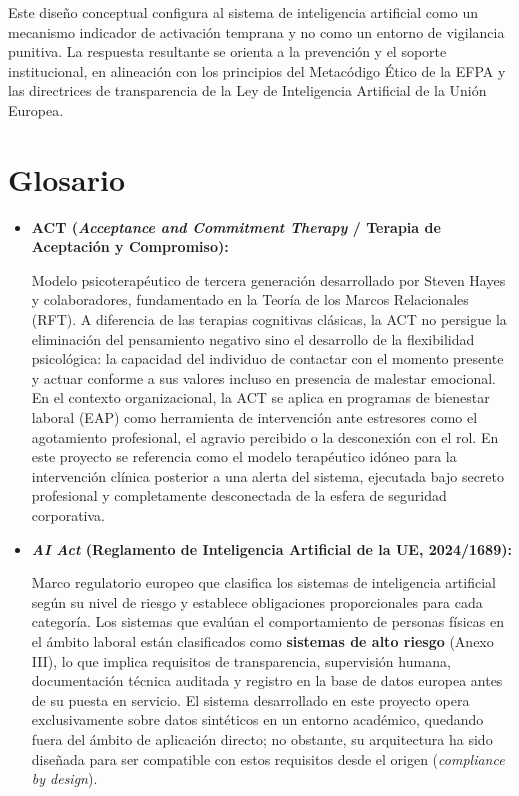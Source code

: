 \documentclass[IB]{TFUOC}%
\begin{document}
\begin{enumerate}
    \noindent Este diseño conceptual configura al sistema de inteligencia artificial como un mecanismo indicador de activación temprana y no como un entorno de vigilancia punitiva. La respuesta resultante se orienta a la prevención y el soporte institucional, en alineación con los principios del Metacódigo Ético de la EFPA y las directrices de transparencia de la Ley de Inteligencia Artificial de la Unión Europea.
\end{enumerate}

\chapter{Glosario}

\begin{itemize}

    \item \textbf{ACT (\textit{Acceptance and Commitment Therapy} / 
    Terapia de Aceptación y Compromiso):}
    
    Modelo psicoterapéutico de tercera generación desarrollado por Steven Hayes y colaboradores, fundamentado en la Teoría de los Marcos Relacionales (RFT). A diferencia de las terapias cognitivas clásicas, la ACT no persigue la eliminación del pensamiento 
    negativo sino el desarrollo de la flexibilidad psicológica: la capacidad del individuo de contactar con el momento presente y actuar conforme a sus valores incluso en presencia de malestar emocional. En el contexto organizacional, la ACT se aplica en programas de bienestar laboral (EAP) como herramienta de intervención ante estresores como el agotamiento profesional, el agravio percibido o la desconexión con el rol. En este proyecto se referencia como el modelo terapéutico idóneo para la intervención clínica posterior a una alerta del sistema, ejecutada bajo secreto profesional y completamente desconectada de la esfera de seguridad corporativa.

    \item \textbf{\textit{AI Act} (Reglamento de Inteligencia Artificial de la UE, 2024/1689):}
    
    Marco regulatorio europeo que clasifica los sistemas de inteligencia artificial según su nivel de riesgo y establece obligaciones proporcionales para cada categoría. Los sistemas que evalúan el comportamiento de personas físicas en el ámbito laboral están clasificados como \textbf{sistemas de alto riesgo} (Anexo III), lo que implica requisitos de transparencia, supervisión humana, documentación técnica auditada y registro en la base de datos europea antes de su puesta en servicio. 
    El sistema desarrollado en este proyecto opera exclusivamente sobre datos sintéticos en un entorno académico, quedando fuera del ámbito de aplicación directo; no obstante, su arquitectura ha sido diseñada para ser compatible con estos requisitos desde el origen (\textit{compliance by design}).


\end{itemize}
\end{document}
